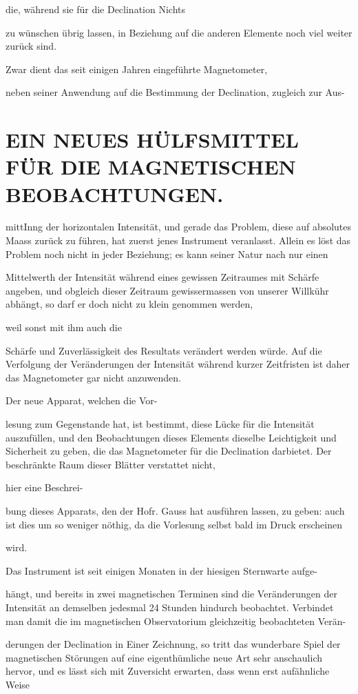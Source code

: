 \documentclass[12pt,a4paper]{article}
\begin{document}
die, während sie für die Declination Nichts

zu wünschen übrig lassen, in Beziehung auf die anderen Elemente noch viel weiter zurück sind.

Zwar dient das seit einigen Jahren eingeführte Magnetometer,

neben seiner Anwendung auf die Bestimmung der Declination, zugleich zur Aus-

\section*{EIN NEUES HÜLFSMITTEL FÜR DIE MAGNETISCHEN BEOBACHTUNGEN.}
mittInng der horizontalen Intensität, und gerade das Problem, diese auf absolutes Maass zurück zu führen, hat zuerst jenes Instrument veranlasst. Allein es löst das Problem noch nicht in jeder Beziehung; es kann seiner Natur nach nur einen

Mittelwerth der Intensität während eines gewissen Zeitraumes mit Schärfe angeben, und obgleich dieser Zeitraum gewissermassen von unserer Willkühr abhängt, so darf er doch nicht zu klein genommen werden,

weil sonst mit ihm auch die

Schärfe und Zuverlässigkeit des Resultats verändert werden würde. Auf die Verfolgung der Veränderungen der Intensität während kurzer Zeitfristen ist daher das Magnetometer gar nicht anzuwenden.

Der neue Apparat, welchen die Vor-

lesung zum Gegenstande hat, ist bestimmt, diese Lücke für die Intensität auszufüllen, und den Beobachtungen dieses Elements dieselbe Leichtigkeit und Sicherheit zu geben, die das Magnetometer für die Declination darbietet. Der beschränkte Raum dieser Blätter verstattet nicht,

hier eine Beschrei-

bung dieses Apparats, den der Hofr. Gauss hat ausführen lassen, zu geben: auch ist dies um so weniger nöthig, da die Vorlesung selbst bald im Druck erscheinen

wird.

Das Instrument ist seit einigen Monaten in der hiesigen Sternwarte aufge-

hängt, und bereits in zwei magnetischen Terminen sind die Veränderungen der Intensität an demselben jedesmal 24 Stunden hindurch beobachtet. Verbindet man damit die im magnetischen Observatorium gleichzeitig beobachteten Verän-

derungen der Declination in Einer Zeichnung, so tritt das wunderbare Spiel der magnetischen Störungen auf eine eigenthümliche neue Art sehr anschaulich hervor, und es lässt sich mit Zuversicht erwarten, dass wenn erst aufähnliche Weise
\end{document}
